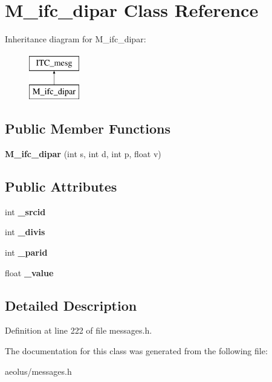 \hypertarget{class_m__ifc__dipar}{}\section{M\+\_\+ifc\+\_\+dipar Class Reference}
\label{class_m__ifc__dipar}
Inheritance diagram for M\+\_\+ifc\+\_\+dipar\+:\begin{figure}[H]
\begin{center}
\leavevmode
\includegraphics[height=2.000000cm]{class_m__ifc__dipar}
\end{center}
\end{figure}
\subsection*{Public Member Functions}
\begin{DoxyCompactItemize}
\item 
\mbox{\label{class_m__ifc__dipar_a277a4677834ebd3cf22abb82942e2343}} 
{\bfseries M\+\_\+ifc\+\_\+dipar} (int s, int d, int p, float v)
\end{DoxyCompactItemize}
\subsection*{Public Attributes}
\begin{DoxyCompactItemize}
\item 
\mbox{\label{class_m__ifc__dipar_ab18a60ada1c1b4d033e8611526c84969}} 
int {\bfseries \+\_\+srcid}
\item 
\mbox{\label{class_m__ifc__dipar_a318d540227eb2112baf54c43ef179d03}} 
int {\bfseries \+\_\+divis}
\item 
\mbox{\label{class_m__ifc__dipar_a965ab8efb4cdc453c102d0d95b5253cc}} 
int {\bfseries \+\_\+parid}
\item 
\mbox{\label{class_m__ifc__dipar_a09e8e03ee56e38ff401f37e380b919aa}} 
float {\bfseries \+\_\+value}
\end{DoxyCompactItemize}


\subsection{Detailed Description}


Definition at line 222 of file messages.\+h.



The documentation for this class was generated from the following file\+:\begin{DoxyCompactItemize}
\item 
aeolus/messages.\+h\end{DoxyCompactItemize}
